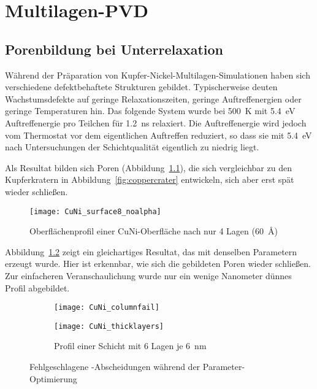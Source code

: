 \chapter{Multilagen-PVD}
\label{appendix:multilayer}

\section{Porenbildung bei Unterrelaxation}

Während der Präparation von Kupfer-Nickel-Multilagen-Simulationen haben sich verschiedene defektbehaftete Strukturen gebildet.
Typischerweise deuten Wachstumsdefekte auf geringe Relaxationszeiten, geringe Auftreffenergien oder geringe Temperaturen hin.
Das folgende System wurde bei \SI{500}{\kelvin} mit \SI{5.4}{\electronvolt} Auftreffenergie pro Teilchen für \SI{1.2}{\nano\second} relaxiert.
Die Auftreffenergie wird jedoch vom Thermostat vor dem eigentlichen Auftreffen reduziert, so dass sie mit \SI{5.4}{\electronvolt} nach Untersuchungen der Schichtqualität eigentlich zu niedrig liegt.

Als Resultat bilden sich Poren (Abbildung~\ref{fig:multilayer_surfacefail}), die sich vergleichbar zu den Kupferkratern in Abbildung~\ref{fig:coppercrater} entwickeln, sich aber erst spät wieder schließen.

\begin{figure}[!ht]
  \centering
  \texttt{[image: CuNi\_surface8\_noalpha]}
  \caption{Oberflächenprofil einer CuNi-Oberfläche nach nur 4 Lagen (\SI{60}{\angstrom})}
  \label{fig:multilayer_surfacefail}
\end{figure}

\clearpage
Abbildung~\ref{fig:multilayer_columnfail} zeigt ein gleichartiges Resultat, das mit denselben Parametern erzeugt wurde.
Hier ist erkennbar, wie sich die gebildeten Poren wieder schließen.
Zur einfacheren Veranschaulichung wurde nur ein wenige Nanometer dünnes Profil abgebildet.

\begin{figure}[!ht]
  \captionsetup[subfigure]{singlelinecheck=false}
  \def\subfigwidth{7cm}
  \begin{subfigure}[t]{\subfigwidth}
    \texttt{[image: CuNi\_columnfail]}
    \label{fig:multilayer_columnfail}
  \end{subfigure}
  \hfill
  \begin{subfigure}[t]{\subfigwidth}
    \texttt{[image: CuNi\_thicklayers]}
    \caption{Profil einer Schicht mit 6 Lagen je \SI{6}{\nano\meter}}
    \label{fig:multilayer_thickfail}
  \end{subfigure}
  \caption{Fehlgeschlagene -Abscheidungen während der Parameter-Optimierung}
\end{figure}

